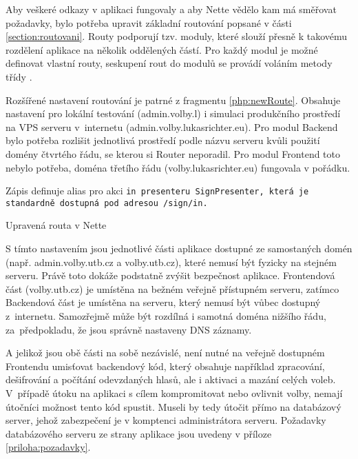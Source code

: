 Aby veškeré odkazy v aplikaci fungovaly a aby Nette vědělo kam má směřovat požadavky, bylo potřeba upravit základní routování popsané v části \ref{section:routovani}. Routy podporují tzv. moduly, které slouží přesně k takovému rozdělení aplikace na několik oddělených částí. Pro každý modul je možné definovat vlastní routy, seskupení rout do modulů se provádí voláním metody  %
třídy . 

\bigskip

Rozšířené nastavení routování je patrné z fragmentu \ref{php:newRoute}. Obsahuje nastavení pro lokální testování (admin.volby.l) i simulaci produkčního prostředí na VPS serveru v~internetu (admin.volby.lukasrichter.eu). Pro modul Backend bylo potřeba rozlišit jednotlivá prostředí podle názvu serveru kvůli použití domény čtvrtého řádu, se kterou si Router neporadil. Pro modul Frontend toto nebylo potřeba, doména třetího řádu (volby.lukasrichter.eu) fungovala v pořádku. 

Zápis  definuje alias pro akci \tt{in} presenteru \tt{SignPresenter}, která je standardně dostupná pod adresou \tt{/sign/in}.
\clearpage

\begin{listing}[ht]
\caption{Upravená routa v Nette}
\label{php:newRoute}
\end{listing}

S tímto nastavením jsou jednotlivé části aplikace dostupné ze samostaných domén (např. admin.volby.utb.cz a volby.utb.cz), které nemusí být fyzicky na stejném serveru. Právě toto dokáže podstatně zvýšit bezpečnost aplikace. Frontendová část (volby.utb.cz) je umístěna na bežném veřejně přístupném serveru, zatímco Backendová část je umístěna na serveru, který nemusí být vůbec dostupný z~internetu. Samozřejmě může být rozdílná i samotná doména nižšího řádu, za~předpokladu, že jsou správně nastaveny DNS záznamy.

A jelikož jsou obě části na sobě nezávislé, není nutné na veřejně dostupném Frontendu umisťovat backendový kód, který obsahuje například zpracování, dešifrování a počítání odevzdaných hlasů, ale i aktivaci a mazání celých voleb. V~případě útoku na aplikaci s cílem kompromitovat nebo ovlivnit volby, nemají útočníci možnost tento kód spustit. Museli by tedy útočit přímo na databázový server, jehož zabezpečení je v komptenci administrátora serveru. Požadavky databázového serveru ze strany aplikace jsou uvedeny v příloze \ref{priloha:pozadavky}.